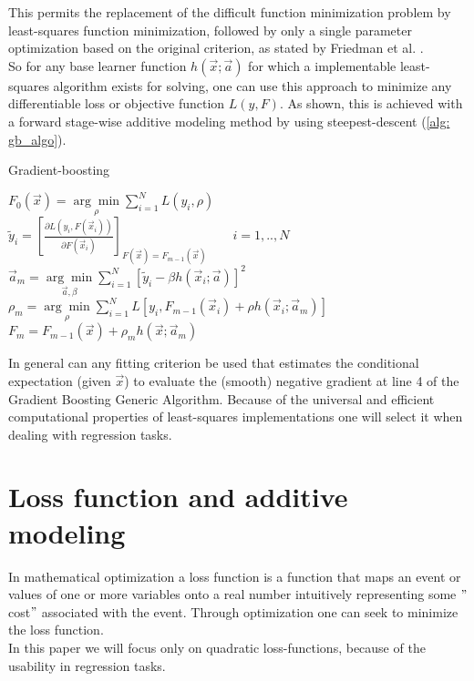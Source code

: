 \documentclass[12pt, a4paper]{article}
\begin{document}
This permits the replacement of the difficult function minimization problem by least-squares function minimization, followed by only a single parameter optimization based on the original criterion, as stated by Friedman et al. \cite{Friedman2001}.\\
So for any base learner function $h(\vec{x};\vec{a})$ for which a implementable least-squares algorithm exists for solving, one can use this approach to minimize any differentiable loss or objective function $L(y,F)$.
As shown, this is achieved with a forward stage-wise additive modeling method by using steepest-descent (\ref{alg: gb_algo}). 
\begin{algorithm}
\caption{Gradient-boosting}
\label{alg: gb_algo}
    $F_0(\vec{x}) = \underset{\rho}{\arg\min} \sum_{i=1}^N L(y_i,\rho)$ \\
    {$\tilde{y}_i = [\frac{\partial L(y_i, F(\vec{x}_i))}{\partial F(\vec{x}_i)}]_{F(\vec{x}) = F_{m-1}(\vec{x})} \qquad i = 1,..,N$
    $\vec{a}_m = \underset{ \vec{a}, \beta }{\arg\min} 
    \sum_{i=1}^N [\tilde{y}_i - \beta h(\vec{x}_i;\vec{a})]^2$
    $\rho_m = \underset{\rho}{\arg\min} \sum_{i=1}^N L[y_i,F_{m-1}(\vec{x}_i) + \rho h(\vec{x}_i;\vec{a}_m)]$
    $F_{m} = F_{m-1}(\vec{x}) + \rho_m h(\vec{x};\vec{a}_m)$
    }
\end{algorithm}


In general can any fitting criterion be used that estimates the conditional expectation (given $\vec{x} $) to evaluate the (smooth) negative gradient at line 4 of the Gradient Boosting Generic Algorithm.
Because of the universal and efficient computational properties of least-squares implementations one will select it when dealing with regression tasks.
\section{Loss function and additive modeling}
In mathematical optimization a loss function is a function that maps an event or values of one or more variables onto a real number intuitively representing some $"$cost$"$ associated with the event. Through optimization one can seek to minimize the loss function. \\
In this paper we will focus only on quadratic loss-functions, because of the usability in regression tasks.
\end{document}
